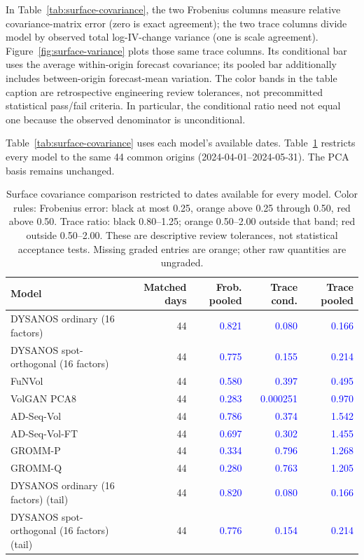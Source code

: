 \documentclass[11pt]{article}
\begin{document}
In Table~\ref{tab:surface-covariance}, the two Frobenius columns measure relative covariance-matrix error (zero is exact agreement); the two trace columns divide model by observed total log-IV-change variance (one is scale agreement). Figure~\ref{fig:surface-variance} plots those same trace columns. Its conditional bar uses the average within-origin forecast covariance; its pooled bar additionally includes between-origin forecast-mean variation. The color bands in the table caption are retrospective engineering review tolerances, not precommitted statistical pass/fail criteria. In particular, the conditional ratio need not equal one because the observed denominator is unconditional.

Table~\ref{tab:surface-covariance} uses each model's available dates. Table~\ref{tab:matched-covariance} restricts every model to the same 44 common origins (2024-04-01--2024-05-31). The PCA basis remains unchanged.

\begin{table}[H]\centering\small\setlength{\tabcolsep}{4pt}
\caption{Surface covariance comparison restricted to dates available for every model. Color rules: Frobenius error: black at most 0.25, orange above 0.25 through 0.50, red above 0.50. Trace ratio: black 0.80--1.25; orange 0.50--2.00 outside that band; red outside 0.50--2.00. These are descriptive review tolerances, not statistical acceptance tests. Missing graded entries are orange; other raw quantities are ungraded.}\label{tab:matched-covariance}
\begin{tabular}{@{}lrrrr@{}}
\toprule
Model & Matched days & Frob. pooled & Trace cond. & Trace pooled \\
\midrule
DYSANOS ordinary (16 factors) & 44 & \textcolor{blue}{0.821} & \textcolor{blue}{0.080} & \textcolor{blue}{0.166} \\
DYSANOS spot-orthogonal (16 factors) & 44 & \textcolor{blue}{0.775} & \textcolor{blue}{0.155} & \textcolor{blue}{0.214} \\
FuNVol & 44 & \textcolor{blue}{0.580} & \textcolor{blue}{0.397} & \textcolor{blue}{0.495} \\
VolGAN PCA8 & 44 & \textcolor{blue}{0.283} & \textcolor{blue}{0.000251} & \textcolor{blue}{0.970} \\
AD-Seq-Vol & 44 & \textcolor{blue}{0.786} & \textcolor{blue}{0.374} & \textcolor{blue}{1.542} \\
AD-Seq-Vol-FT & 44 & \textcolor{blue}{0.697} & \textcolor{blue}{0.302} & \textcolor{blue}{1.455} \\
GROMM-P & 44 & \textcolor{blue}{0.334} & \textcolor{blue}{0.796} & \textcolor{blue}{1.268} \\
GROMM-Q & 44 & \textcolor{blue}{0.280} & \textcolor{blue}{0.763} & \textcolor{blue}{1.205} \\
DYSANOS ordinary (16 factors) (tail) & 44 & \textcolor{blue}{0.820} & \textcolor{blue}{0.080} & \textcolor{blue}{0.166} \\
DYSANOS spot-orthogonal (16 factors) (tail) & 44 & \textcolor{blue}{0.776} & \textcolor{blue}{0.154} & \textcolor{blue}{0.214} \\
\bottomrule\end{tabular}\end{table}
\end{document}
